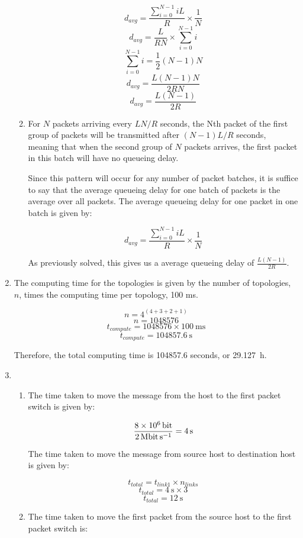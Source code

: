 \documentclass{article}
\begin{document}
\begin{enumerate}
\begin{enumerate}
$$ d_{avg} = \frac{\sum_{i=0}^{N-1} iL}{R} \times \frac{1}{N}$$
$$ d_{avg} = \frac{L}{RN} \times \sum_{i=0}^{N-1} i $$
$$ \sum_{i=0}^{N-1} i = \frac{1}{2}(N-1)N $$
$$ d_{avg} = \frac{L(N-1)N}{2RN} $$
$$ d_{avg} = \frac{L(N-1)}{2R} $$

\item For $N$ packets arriving every $LN/R$ seconds, the Nth packet of the first group of packets will be transmitted after $(N-1)L/R$ seconds, meaning that when the second group of $N$ packets arrives, the first packet in this batch will have no queueing delay.

Since this pattern will occur for any number of packet batches, it is suffice to say that the average queueing delay for one batch of packets is the average over all packets. The average queueing delay for one packet in one batch is given by:

$$ d_{avg} = \frac{\sum_{i=0}^{N-1} iL}{R} \times \frac{1}{N} $$

As previously solved, this gives us a average queueing delay of $\frac{L(N-1)}{2R}$.

\end{enumerate}

\item The computing time for the topologies is given by the number of topologies, $n$, times the computing time per topology, 100 ms.

$$ n = 4^{(4+3+2+1)} $$
$$ n = 1048576 $$
$$ t_{compute} = 1048576 \times \SI{100}{\milli\second} $$
$$ t_{compute} = \SI{104857.6}{\second} $$

Therefore, the total computing time is 104857.6 seconds, or \SI{29.127}{\hour}.

\item
\begin{enumerate}

\item The time taken to move the message from the host to the first packet switch is given by:

$$ \frac{\SI{8e6}{\bit}}{\SI{2}{\mega\bit\per\second}} = \SI{4}{\second}$$

The time taken to move the message from source host to destination host is given by:

$$ t_{total} = t_{link 1} \times n_{links} $$
$$ t_{total} = \SI{4}{\second} \times 3 $$
$$ t_{total} = \SI{12}{\second}$$

\item The time taken to move the first packet from the source host to the first packet switch is:


\end{enumerate}
\end{enumerate}
\end{document}
